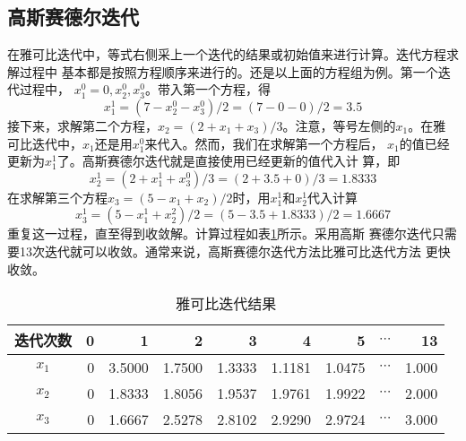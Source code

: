 \subsection{高斯赛德尔迭代}
在雅可比迭代中，等式右侧采上一个迭代的结果或初始值来进行计算。迭代方程求解过程中
基本都是按照方程顺序来进行的。还是以上面的方程组为例。第一个迭代过程中，
$x_{1}^{0}=0,x_{2}^{0},x_{3}^{0}$。带入第一个方程，得
\begin{equation}
  x_{1}^{1} = (7-x_{2}^{0}-x_{3}^{0})/2 = (7-0-0)/2=3.5
\end{equation}
接下来，求解第二个方程，$x_{2}=(2+x_{1}+x_{3})/3$。注意，等号左侧的$x_{1}$。在雅
可比迭代中，$x_{1}$还是用$x_{1}^{0}$来代入。然而，我们在求解第一个方程后，
$x_{1}$的值已经更新为$x_{1}^{1}$了。高斯赛德尔迭代就是直接使用已经更新的值代入计
算，即
\begin{equation}
  x_{2}^{1} = (2+x_{1}^{1}+x_{3}^{0})/3=(2+3.5+0)/3 = 1.8333
\end{equation}
在求解第三个方程$x_{3}=(5-x_{1}+x_{2})/2$时，用$x_{1}^{1}$和$x_{2}^{1}$代入计算
\begin{equation}
  x_{3}^{1} = (5-x_{1}^{1}+x_{2}^{2})/2=(5-3.5+1.8333)/2=1.6667
\end{equation}
重复这一过程，直至得到收敛解。计算过程如表\ref{TbLA_Gauss_result}所示。采用高斯
赛德尔迭代只需要13次迭代就可以收敛。通常来说，高斯赛德尔迭代方法比雅可比迭代方法
更快收敛。
\begin{table}[h!]
  \begin{center}
  \caption{雅可比迭代结果}
  \label{TbLA_Gauss_result}
  \begin{tabular}{|c|r|r|r|r|r|r|r|r|}
    \hline
    迭代次数 & 0 & 1 & 2 & 3 & 4 & 5 & $\cdots$ & 13 \\
    \hline
    $x_{1}$ & 0 & 3.5000 & 1.7500 & 1.3333 & 1.1181 & 1.0475 & $\cdots$ & 1.000
    \\
    \hline
    $x_{2}$ & 0 & 1.8333 & 1.8056 & 1.9537 & 1.9761 & 1.9922 & $\cdots$ & 2.000
    \\
    \hline
    $x_{3}$ & 0 & 1.6667 & 2.5278 & 2.8102 & 2.9290 & 2.9724 & $\cdots$ & 3.000
    \\
    \hline
  \end{tabular}
  \end{center}
\end{table}

